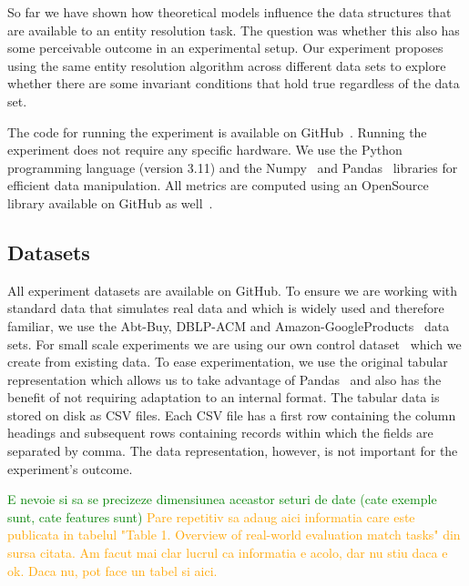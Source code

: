 So far we have shown how theoretical models influence the data structures
that are available to an entity resolution task.
The question was whether this also has some perceivable outcome in an
experimental setup.
Our experiment proposes using the same entity resolution algorithm across
different data sets to explore whether there are some invariant conditions
that hold true regardless of the data set.

The code for running the experiment is available on GitHub~\cite{matchescu}.
Running the experiment does not require any specific hardware.
We use the Python~\cite{python} programming language (version 3.11) and the
Numpy~\cite{numpy} and Pandas~\cite{pandas2023} libraries for efficient
data manipulation.
All metrics are computed using an OpenSource library available on GitHub as
well~\cite{matchescu-er-metrics2023}.

\subsection{Datasets}\label{subsec:data}

All experiment datasets are available on GitHub\cite{expdata2023}.
To ensure we are working with standard data that simulates real data and which
is widely used and therefore familiar, we use the Abt-Buy, DBLP-ACM and
Amazon-GoogleProducts~\cite{vldb2010} data sets.
For small scale experiments we are using our own control
dataset~\cite{expdata2023} which we create from existing data.
To ease experimentation, we use the original tabular representation
which allows us to take advantage of Pandas~\cite{pandas2010,pandas2023}
and also has the benefit of not requiring adaptation to an internal format.
The tabular data is stored on disk as CSV files.
Each CSV file has a first row containing the column headings and subsequent
rows containing records within which the fields are separated by comma.
The data representation, however, is not important for the experiment's
outcome.

\textcolor{green}{
E nevoie si sa se precizeze dimensiunea aceastor seturi de date (cate exemple
sunt, cate features sunt)
}
\textcolor{orange}{
    Pare repetitiv sa adaug aici informatia care este publicata in tabelul
    "Table 1. Overview of real-world evaluation match tasks"
    din sursa citata.
    Am facut mai clar lucrul ca informatia e acolo, dar nu stiu daca e ok.
    Daca nu, pot face un tabel si aici.    
}


